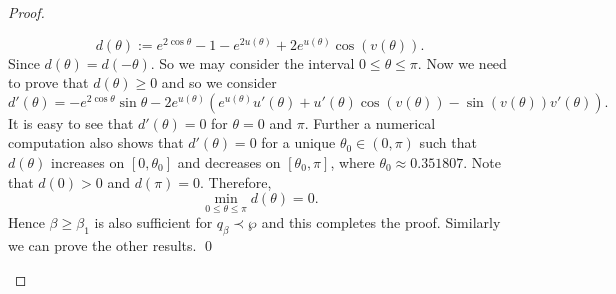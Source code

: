 \documentclass[12pt, reqno]{amsart}
\numberwithin{equation}{section}
\theoremstyle{plain}
\theoremstyle{definition}
\theoremstyle{remark}
\begin{document}
\begin{proof}
\begin{itemize}
		$$d(\theta):=e^{2\cos{\theta}}-1-e^{2u(\theta)}+2e^{u(\theta)}\cos(v(\theta)).$$
		Since $d(\theta)=d(-\theta)$. So we may consider the interval $0\leq\theta\leq\pi$. Now we need to prove that $d(\theta)\geq0$ and so we consider 
		\begin{equation*}
		d'(\theta)=-e^{2\cos\theta}\sin\theta -2e^{u(\theta)}(e^{u(\theta)}u'(\theta) +u'(\theta)\cos(v(\theta))  -\sin(v(\theta)) v'(\theta)).
		\end{equation*}
		It is easy to see that $d'(\theta)=0$ for $\theta=0$ and $\pi$. Further a numerical computation also shows that $d'(\theta)=0$ for a unique $\theta_0\in(0,\pi)$ such that $d(\theta)$ increases on $[0,\theta_0]$ and decreases on $[\theta_0, \pi]$, where $\theta_0\approx0.351807$. Note that $d(0)>0$ and $d(\pi)=0$. Therefore,
		$$\min_{0\leq\theta\leq\pi}d(\theta)=0.$$ 
		Hence $\beta\geq\beta_1$  is also sufficient for $q_{\beta} \prec \wp$ and this completes the proof. Similarly we can prove the other results. \qed
		

\end{itemize}
\end{proof}
\end{document}
